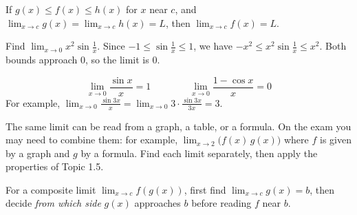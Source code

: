 \documentclass[11pt]{article}
\begin{document}
\begin{keyidea}
If $g(x)\le f(x)\le h(x)$ for $x$ near $c$, and $\displaystyle\lim_{x\to c}g(x)=\lim_{x\to c}h(x)=L$, then $\displaystyle\lim_{x\to c}f(x)=L$.
\end{keyidea}
\begin{example}
Find $\displaystyle\lim_{x\to0}x^2\sin\frac1x$.
\sol Since $-1\le\sin\frac1x\le1$, we have $-x^2\le x^2\sin\frac1x\le x^2$. Both bounds approach $0$, so the limit is $0$.
\end{example}
\begin{keyidea}
\[\lim_{x\to0}\frac{\sin x}{x}=1\qquad\qquad\lim_{x\to0}\frac{1-\cos x}{x}=0\]
For example, $\displaystyle\lim_{x\to0}\frac{\sin 3x}{x}=\lim_{x\to0}3\cdot\frac{\sin3x}{3x}=3$.
\end{keyidea}

The same limit can be read from a graph, a table, or a formula. On the exam you may need to combine them: for example, $\displaystyle\lim_{x\to2}\big(f(x)\,g(x)\big)$ where $f$ is given by a graph and $g$ by a formula. Find each limit separately, then apply the properties of Topic 1.5.

\begin{aptip}
For a composite limit $\displaystyle\lim_{x\to c}f(g(x))$, first find $\displaystyle\lim_{x\to c}g(x)=b$, then decide \emph{from which side} $g(x)$ approaches $b$ before reading $f$ near $b$.
\end{aptip}
\end{document}
